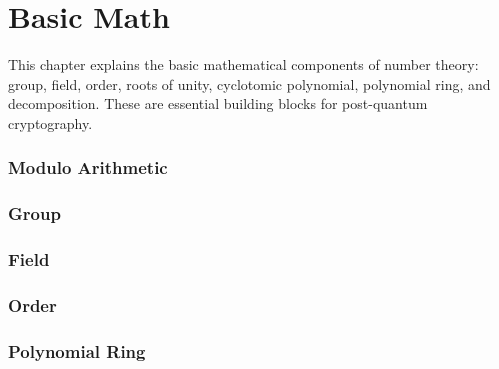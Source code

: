 \documentclass[11pt]{article}
\begin{document}



\clearpage



\part{Basic Math}
\label{part:basic-math}

\renewcommand{\thesection}{A-\arabic{section}}
\setcounter{section}{0}

This chapter explains the basic mathematical components of number theory: group, field, order, roots of unity, cyclotomic polynomial, polynomial ring, and decomposition. These are essential building blocks for post-quantum cryptography.

\clearpage

\section{Modulo Arithmetic}
\label{sec:modulo}


\clearpage

\section{Group}
\label{sec:group}



\clearpage

\section{Field}
\label{sec:field}


\clearpage

\section{Order}
\label{sec:order}




\clearpage

\section{Polynomial Ring}
\label{sec:polynomial-ring}

\end{document}
